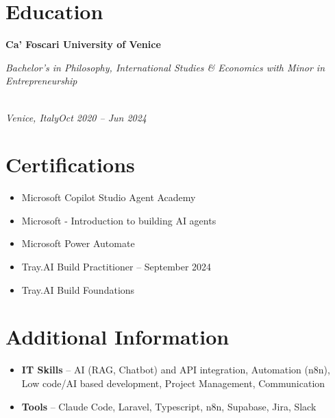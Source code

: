 \documentclass[a4paper,10pt]{article}
\newcommand{\role}[4]{\vspace{3pt}\noindent\hspace{0.6em}\parbox[t]{0.38\textwidth}{\raggedright\textbf{#1}}\hfill\parbox[t]{0.58\textwidth}{\raggedleft\textit{#2}}\\{\textit{#3}\hfill\textit{#4}}\vspace{1pt}}
\begin{document}
\section{Education}
\role{Ca' Foscari University of Venice}{Bachelor's in Philosophy, International Studies \& Economics with Minor in Entrepreneurship}{Venice, Italy}{Oct 2020 -- Jun 2024}

\section{Certifications}
\begin{itemize}
\item Microsoft Copilot Studio Agent Academy
\item Microsoft - Introduction to building AI agents
\item Microsoft Power Automate
\item Tray.AI Build Practitioner -- September 2024
\item Tray.AI Build Foundations
\end{itemize}

\section{Additional Information}
\begin{itemize}
\item \textbf{IT Skills} -- AI (RAG, Chatbot) and API integration, Automation (n8n), Low code/AI based development, Project Management, Communication
\item \textbf{Tools} -- Claude Code, Laravel, Typescript, n8n, Supabase, Jira, Slack
\end{itemize}
\end{document}
